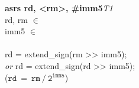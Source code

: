 


\begin{instructionblock}{\imagewidth}%
    \textbf{asrs rd, <rm>, \#imm5}\hfill\textit{T1}\\
    rd, rm $\in$ \baseregisters\\
    imm5 $\in$ \immFive\\
    \\
    rd = extend\_sign(rm {>}{>} imm5);\\
    \textit{or} rd = extend\_sign(rd {>}{>} imm5);\\
    ($\mathtt{rd\ =\ rm\ /\ 2^{imm5}}$)
\end{instructionblock}

